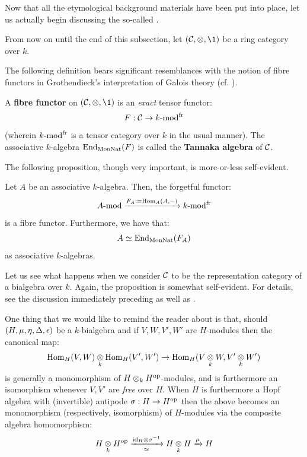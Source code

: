         Now that all the etymological background materials have been put into place, let us actually begin discussing the so-called . 
        \begin{convention}
            From now on until the end of this subsection, let $(\C, \tensor, \1)$ be a ring category over $k$. 
        \end{convention}
        The following definition bears significant resemblances with the notion of fibre functors in Grothendieck's interpretation of Galois theory (cf. \cite[Expos\'e V]{SGA1}).
        \begin{definition} \label{def: fibre_functors}
            A \textbf{fibre functor} on $(\C, \tensor, \1)$ is an \textit{exact} tensor functor:
                $$F: \mathcal{C} \to k\text{-}\mathrm{mod}^{\mathrm{fr}}$$
            (wherein $k\text{-}\mathrm{mod}^{\mathrm{fr}}$ is a tensor category over $k$ in the usual manner). The associative $k$-algebra $\operatorname{End}_{\mathrm{Mon}\mathrm{Nat}}(F)$ is called the \textbf{Tannaka algebra} of $\mathcal{C}$.
        \end{definition}
        The following proposition, though very important, is more-or-less self-evident. 
        \begin{proposition} \label{prop: fibre_functors_for_representation_categories_of_associative_algebras}
            Let $A$ be an associative $k$-algebra. Then, the forgetful functor:
                $$A\text{-}\mathrm{mod} \xrightarrow[]{F_A := \operatorname{Hom}_A(A, -)} k\text{-}\mathrm{mod}^{\mathrm{fr}}$$
            is a fibre functor. Furthermore, we have that:
                $$A \simeq \operatorname{End}_{\mathrm{Mon}\mathrm{Nat}}(F_A)$$
            as associative $k$-algebras. 
        \end{proposition}
        Let us see what happens when we consider $\mathcal{C}$ to be the representation category of a bialgebra over $k$. Again, the proposition is somewhat self-evident. For details, see the discussion immediately preceding \cite[Section 5.2]{EGNO} as well as \cite[Section 5.3]{EGNO}.
        \begin{remark}
            One thing that we would like to remind the reader about is that, should $(H, \mu, \eta, \Delta, \epsilon)$ be a $k$-bialgebra and if $V, W, V', W'$ are $H$-modules then the canonical map:
                $$\Hom_H(V, W) \tensor_k \Hom_H(V', W') \to \Hom_H(V \tensor_k W, V' \tensor_k W')$$
            is generally a monomorphism of $H \tensor_k H^{\op}$-modules, and is furthermore an isomorphism whenever $V, V'$ are \textit{free} over $H$. When $H$ is furthermore a Hopf algebra with (invertible) antipode $\sigma: H \to H^{\mathrm{op}}$ then the above becomes an monomorphism (respectively, isomorphism) of $H$-modules via the composite algebra homomorphism:
                $$H \tensor_k H^{\op} \xrightarrow[\cong]{\id_H \tensor \sigma^{-1}} H \tensor_k H \xrightarrow[]{\mu} H$$
        \end{remark}
